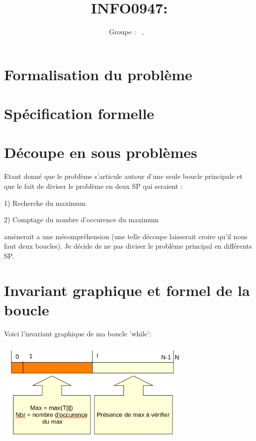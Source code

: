 \documentclass[a4paper, 11pt, oneside]{article}
\title{INFO0947: \intitule}
\author{Groupe \GrNbr : \PrenomUN~\textsc{\NomUN}, \PrenomDEUX~\textsc{\NomDEUX}}
\date{}
\newcommand{\tablemat}{~}
\renewcommand{\tablemat}{\tableofcontents}
\begin{document}
\maketitle
\newpage
\tablemat
\newpage


\section{Formalisation du problème}





\section{Spécification formelle}







\section{Découpe en sous problèmes}

Etant donné que le problème s'articule autour d'une seule boucle principale et que le fait de diviser le problème en deux SP qui seraient :

1) Recherche du maximum

2) Comptage du nombre d'occurence du maximum

amènerait a une mécompréhension (une telle découpe laisserait croire qu'il nous faut deux boucles).
Je décide de ne pas diviser le problème principal en différents SP.




\section{Invariant graphique et formel de la boucle}

\begin{center}

Voici l'invariant graphique de ma boucle 'while':

\includegraphics[width=0.70\textwidth]{gliprojet1.png}

\end{center}
\end{document}
